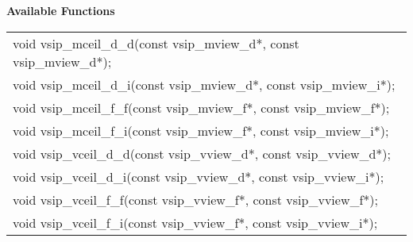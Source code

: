 \\\cvsiplh
\\ \hspace*{.8cm} \vspace*{.1cm} \textbf{Available Functions }
\\ \hspace*{1.1cm} {
\ttfamily
\begin{tabular}[H]{l}
void vsip\_mceil\_d\_d(const vsip\_mview\_d*, const vsip\_mview\_d*);\\
void vsip\_mceil\_d\_i(const vsip\_mview\_d*, const vsip\_mview\_i*);\\
void vsip\_mceil\_f\_f(const vsip\_mview\_f*, const vsip\_mview\_f*);\\
void vsip\_mceil\_f\_i(const vsip\_mview\_f*, const vsip\_mview\_i*);\\
void vsip\_vceil\_d\_d(const vsip\_vview\_d*, const vsip\_vview\_d*);\\
void vsip\_vceil\_d\_i(const vsip\_vview\_d*, const vsip\_vview\_i*);\\
void vsip\_vceil\_f\_f(const vsip\_vview\_f*, const vsip\_vview\_f*);\\
void vsip\_vceil\_f\_i(const vsip\_vview\_f*, const vsip\_vview\_i*);\\
\end{tabular}
}
\\\pyjvsiph
{}